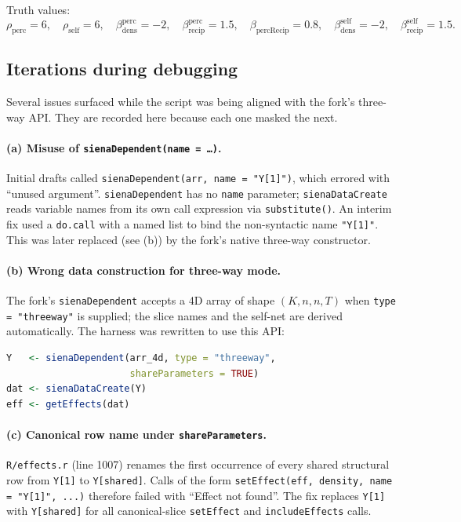 \documentclass[11pt]{article}
\newcommand{\perc}{\mathrm{perc}}
\newcommand{\self}{\mathrm{self}}
\begin{document}
Truth values:
\[
\rho_\perc = 6,\quad \rho_\self = 6,\quad
\beta_{\text{dens}}^\perc = -2,\quad
\beta_{\text{recip}}^\perc = 1.5,\quad
\beta_{\text{percRecip}} = 0.8,\quad
\beta_{\text{dens}}^\self = -2,\quad
\beta_{\text{recip}}^\self = 1.5.
\]

\subsection{Iterations during debugging}

Several issues surfaced while the script was being aligned with the
fork's three-way API.  They are recorded here because each one masked
the next.

\paragraph{(a) Misuse of \texttt{sienaDependent(name = \dots)}.}
Initial drafts called
\verb|sienaDependent(arr, name = "Y[1]")|, which errored with
``unused argument''.  \texttt{sienaDependent} has no \texttt{name}
parameter; \texttt{sienaDataCreate} reads variable names from its own
call expression via \texttt{substitute()}.  An interim fix used a
\texttt{do.call} with a named list to bind the non-syntactic name
\texttt{"Y[1]"}.  This was later replaced (see (b)) by the fork's
native three-way constructor.

\paragraph{(b) Wrong data construction for three-way mode.}
The fork's \texttt{sienaDependent} accepts a 4D array of shape
$(K,n,n,T)$ when \texttt{type = "threeway"} is supplied; the slice
names and the self-net are derived automatically.  The harness was
rewritten to use this API:

\begin{lstlisting}[language=R]
Y   <- sienaDependent(arr_4d, type = "threeway",
                      shareParameters = TRUE)
dat <- sienaDataCreate(Y)
eff <- getEffects(dat)
\end{lstlisting}

\paragraph{(c) Canonical row name under \texttt{shareParameters}.}
\texttt{R/effects.r} (line 1007) renames the first occurrence of every
shared structural row from \texttt{Y[1]} to \texttt{Y[shared]}.
Calls of the form
\verb|setEffect(eff, density, name = "Y[1]", ...)|
therefore failed with ``Effect not found''.  The fix replaces
\texttt{Y[1]} with \texttt{Y[shared]} for all canonical-slice
\texttt{setEffect} and \texttt{includeEffects} calls.
\end{document}
